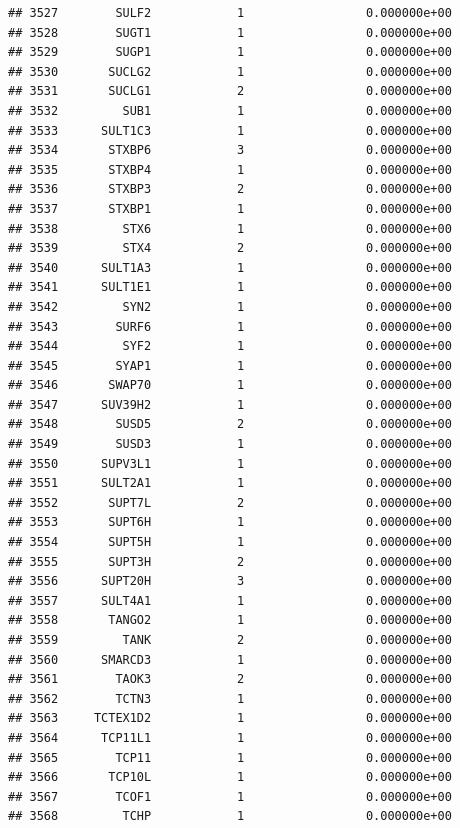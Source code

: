 \documentclass[
]{article}
\begin{document}
\begin{verbatim}
## 3527        SULF2            1                 0.000000e+00
## 3528        SUGT1            1                 0.000000e+00
## 3529        SUGP1            1                 0.000000e+00
## 3530       SUCLG2            1                 0.000000e+00
## 3531       SUCLG1            2                 0.000000e+00
## 3532         SUB1            1                 0.000000e+00
## 3533      SULT1C3            1                 0.000000e+00
## 3534       STXBP6            3                 0.000000e+00
## 3535       STXBP4            1                 0.000000e+00
## 3536       STXBP3            2                 0.000000e+00
## 3537       STXBP1            1                 0.000000e+00
## 3538         STX6            1                 0.000000e+00
## 3539         STX4            2                 0.000000e+00
## 3540      SULT1A3            1                 0.000000e+00
## 3541      SULT1E1            1                 0.000000e+00
## 3542         SYN2            1                 0.000000e+00
## 3543        SURF6            1                 0.000000e+00
## 3544         SYF2            1                 0.000000e+00
## 3545        SYAP1            1                 0.000000e+00
## 3546       SWAP70            1                 0.000000e+00
## 3547      SUV39H2            1                 0.000000e+00
## 3548        SUSD5            2                 0.000000e+00
## 3549        SUSD3            1                 0.000000e+00
## 3550      SUPV3L1            1                 0.000000e+00
## 3551      SULT2A1            1                 0.000000e+00
## 3552       SUPT7L            2                 0.000000e+00
## 3553       SUPT6H            1                 0.000000e+00
## 3554       SUPT5H            1                 0.000000e+00
## 3555       SUPT3H            2                 0.000000e+00
## 3556      SUPT20H            3                 0.000000e+00
## 3557      SULT4A1            1                 0.000000e+00
## 3558       TANGO2            1                 0.000000e+00
## 3559         TANK            2                 0.000000e+00
## 3560      SMARCD3            1                 0.000000e+00
## 3561        TAOK3            2                 0.000000e+00
## 3562        TCTN3            1                 0.000000e+00
## 3563     TCTEX1D2            1                 0.000000e+00
## 3564      TCP11L1            1                 0.000000e+00
## 3565        TCP11            1                 0.000000e+00
## 3566       TCP10L            1                 0.000000e+00
## 3567        TCOF1            1                 0.000000e+00
## 3568         TCHP            1                 0.000000e+00

\end{verbatim}
\end{document}
